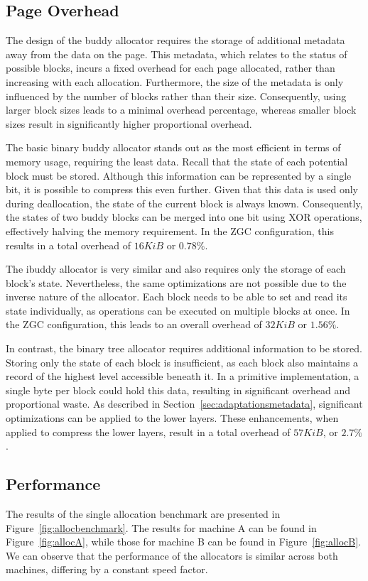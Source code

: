 
\subsection{Page Overhead}
The design of the buddy allocator requires the storage of additional metadata away from the data on the page. This metadata, which relates to the status of possible blocks, incurs a fixed overhead for each page allocated, rather than increasing with each allocation. Furthermore, the size of the metadata is only influenced by the number of blocks rather than their size. Consequently, using larger block sizes leads to a minimal overhead percentage, whereas smaller block sizes result in significantly higher proportional overhead.

The basic binary buddy allocator stands out as the most efficient in terms of memory usage, requiring the least data. Recall that the state of each potential block must be stored. Although this information can be represented by a single bit, it is possible to compress this even further. Given that this data is used only during deallocation, the state of the current block is always known. Consequently, the states of two buddy blocks can be merged into one bit using XOR operations, effectively halving the memory requirement. In the ZGC configuration, this results in a total overhead of $16 KiB$ or $0.78\%$.

The ibuddy allocator is very similar and also requires only the storage of each block's state. Nevertheless, the same optimizations are not possible due to the inverse nature of the allocator. Each block needs to be able to set and read its state individually, as operations can be executed on multiple blocks at once. In the ZGC configuration, this leads to an overall overhead of $32 KiB$ or $1.56\%$.

In contrast, the binary tree allocator requires additional information to be stored. Storing only the state of each block is insufficient, as each block also maintains a record of the highest level accessible beneath it. In a primitive implementation, a single byte per block could hold this data, resulting in significant overhead and proportional waste. As described in Section~\ref{sec:adaptationsmetadata}, significant optimizations can be applied to the lower layers. These enhancements, when applied to compress the lower layers, result in a total overhead of $57 KiB$, or $2.7\%$.

\vspace{-0.2cm}
\subsection{Performance}
The results of the single allocation benchmark are presented in Figure~\ref{fig:allocbenchmark}. The results for machine A can be found in Figure~\ref{fig:allocA}, while those for machine B can be found in Figure~\ref{fig:allocB}. We can observe that the performance of the allocators is similar across both machines, differing by a constant speed factor.



